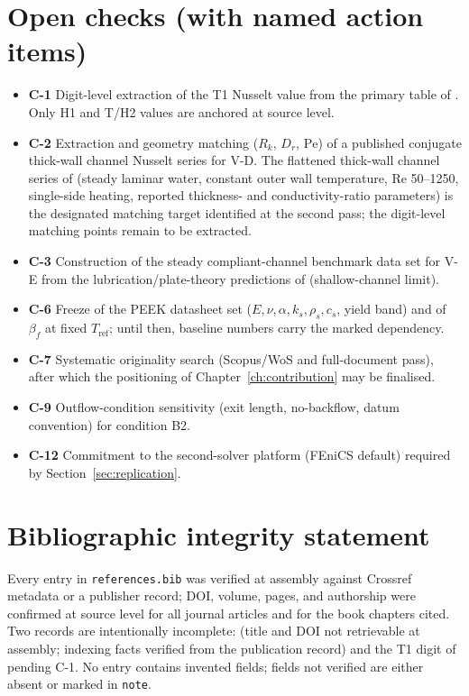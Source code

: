 \section{Open checks (with named action items)}
\begin{itemize}\itemsep1pt
\item \textbf{C-1} Digit-level extraction of the T1 Nusselt value from the primary table of
\cite{shah1978laminar}. Only H1 and T/H2 values are anchored at source level.
\item \textbf{C-2} Extraction and geometry matching ($R_k$, $D_r$, $\mathrm{Pe}$) of a published
conjugate thick-wall channel Nusselt series for V-D. The flattened thick-wall channel series of
\cite{rahimi2024conjugate} (steady laminar water, constant outer wall temperature, Re 50--1250,
single-side heating, reported thickness- and conductivity-ratio parameters) is the designated
matching target identified at the second pass; the digit-level matching points remain to be
extracted.
\item \textbf{C-3} Construction of the steady compliant-channel benchmark data set for V-E from the
lubrication/plate-theory predictions of \cite{christov2018flow} (shallow-channel limit).
\item \textbf{C-6} Freeze of the PEEK datasheet set ($E,\nu,\alpha,k_s,\rho_s,c_s$, yield band) and
of $\beta_f$ at fixed $T_{\mathrm{ref}}$; until then, baseline numbers carry the marked dependency.
\item \textbf{C-7} Systematic originality search (Scopus/WoS and full-document pass), after which
the positioning of Chapter~\ref{ch:contribution} may be finalised.
\item \textbf{C-9} Outflow-condition sensitivity (exit length, no-backflow, datum convention) for
condition B2.
\item \textbf{C-12} Commitment to the second-solver platform (FEniCS default) required by
Section~\ref{sec:replication}.
\end{itemize}

\section{Bibliographic integrity statement}
Every entry in \texttt{references.bib} was verified at assembly against Crossref metadata or a
publisher record; DOI, volume, pages, and authorship were confirmed at source level for all
journal articles and for the book chapters cited. Two records are intentionally incomplete:
\cite{gupta2024photothermo} (title and DOI not retrievable at assembly; indexing facts verified
from the publication record) and the T1 digit of \cite{shah1978laminar} pending C-1. No entry
contains invented fields; fields not verified are either absent or marked in \texttt{note}.

